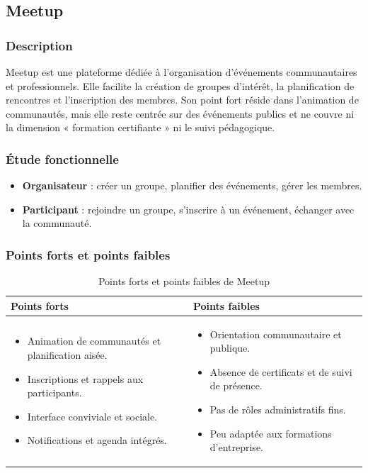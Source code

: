\documentclass[12pt,a4paper,oneside]{report}
\begin{document}
\subsection{Meetup}
\subsubsection{Description}
Meetup est une plateforme dédiée à l'organisation d'événements communautaires et
professionnels. Elle facilite la création de groupes d'intérêt, la planification de rencontres
et l'inscription des membres. Son point fort réside dans l'animation de communautés, mais elle
reste centrée sur des événements publics et ne couvre ni la dimension « formation
certifiante » ni le suivi pédagogique.

\subsubsection{Étude fonctionnelle}
\begin{itemize}[leftmargin=1.2cm]
  \item \textbf{Organisateur} : créer un groupe, planifier des événements, gérer les membres.
  \item \textbf{Participant} : rejoindre un groupe, s'inscrire à un événement, échanger avec la
  communauté.
\end{itemize}

\subsubsection{Points forts et points faibles}
\begin{table}[H]\centering\renewcommand{\arraystretch}{1.25}
\begin{tabular}{|p{}|p{}|}\hline
\rowcolor{gray!15}\textbf{Points forts} & \textbf{Points faibles} \\ \hline
\begin{itemize}[leftmargin=*,topsep=4pt,itemsep=2pt]
  \item Animation de communautés et planification aisée.
  \item Inscriptions et rappels aux participants.
  \item Interface conviviale et sociale.
  \item Notifications et agenda intégrés.
\end{itemize}
&
\begin{itemize}[leftmargin=*,topsep=4pt,itemsep=2pt]
  \item Orientation communautaire et publique.
  \item Absence de certificats et de suivi de présence.
  \item Pas de rôles administratifs fins.
  \item Peu adaptée aux formations d'entreprise.
\end{itemize} \\ \hline
\end{tabular}
\caption{Points forts et points faibles de Meetup}\label{tab:meetup}
\end{table}
\end{document}
